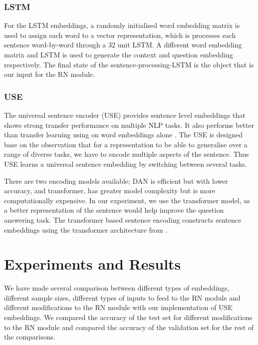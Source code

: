\documentclass{article}
\begin{document}





\subsubsection{LSTM}
For the LSTM embeddings, a randomly initialised word embedding matrix is used to assign each word to a vector representation, which is processes each sentence word-by-word through a 32 unit LSTM. A different word embedding matrix and LSTM is used to generate the context and question embedding respectively. The final state of the sentence-processing-LSTM is the object that is our input for the RN module.

\subsubsection{USE}
The universal sentence encoder (USE) provides sentence level embeddings that shows strong transfer performance on multiple NLP tasks. It also performs better than transfer learning using on word embeddings alone \cite{Cer2018}. The USE is designed base on the observation that for a representation to be able to generalise over a range of diverse tasks, we have to encode multiple aspects of the sentence. Thus USE learns a universal sentence embedding by switching between several tasks. 

There are two encoding models available; DAN is efficient but with lower accuracy, and transformer, has greater model complexity but is more computationally expensive. In our experiment, we use the transformer model, as a better representation of the sentence would help improve the question answering task. The transformer based sentence encoding constructs sentence embeddings using the transformer architecture from \cite{NIPS2017_7181}.



\section{Experiments and Results}


We have made several comparison between different types of embeddings, different sample sizes, different types of inputs to feed to the RN module and different modifications to the RN module with our implementation of USE embeddings. We compared the accuracy of the test set for different modifications to the RN module and compared the accuracy of the validation set for the rest of the comparisons.
\end{document}
